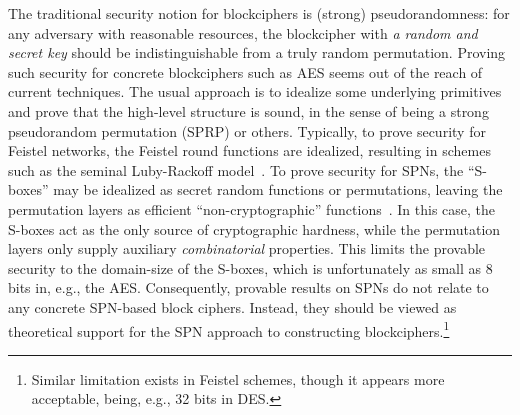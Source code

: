 \documentclass[journal=tosc,final,nohyperref]{iacrtrans}
\begin{document}



The traditional security notion for blockciphers is (strong) pseudorandomness: for any adversary with reasonable resources, the blockcipher with {\it a random and secret key} should be indistinguishable from a truly random
permutation. Proving such security for concrete blockciphers such as AES
seems out of the reach of current techniques. The usual approach is to idealize some underlying primitives and prove that the high-level structure is sound, in the sense of being a strong pseudorandom permutation (SPRP) or others. Typically, to prove security for Feistel networks, the Feistel round functions are idealized, resulting in schemes such as the seminal Luby-Rackoff model~\cite{DBLP:journals/siamcomp/LubyR88,EC:MauPie03,C:patarin03,C:patarin04,C:HoaRog10,JC:CHKPST16}. To prove security for SPNs, the ``S-boxes'' may be idealized as secret random functions or permutations, leaving the permutation layers as efficient ``non-cryptographic'' functions~\cite{FSE:IwaKur00,miles2015substitution}. In this case, the S-boxes act as the only source of cryptographic hardness, while the permutation layers only supply auxiliary {\it combinatorial} properties. This limits the provable security to the domain-size of the S-boxes, which is unfortunately as small as 8 bits in, e.g., the AES. Consequently, provable results on SPNs do not relate to any concrete SPN-based block ciphers. Instead, they should be viewed as theoretical support for the SPN approach to constructing blockciphers.\footnote{Similar limitation exists in Feistel schemes, though it appears more acceptable, being, e.g., 32 bits in DES.}
\end{document}
